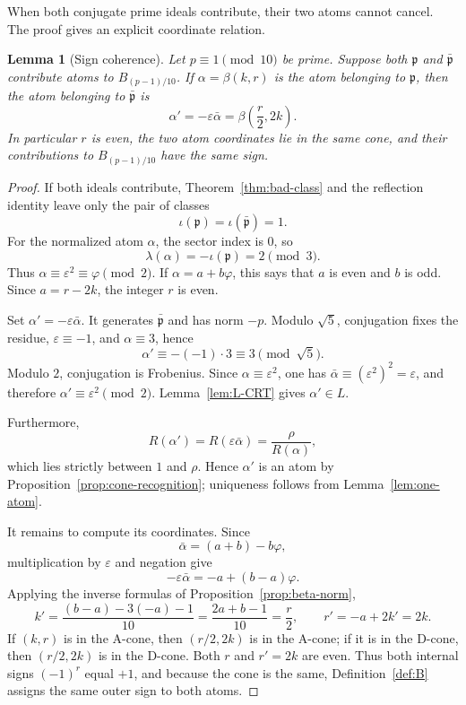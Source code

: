 \documentclass[12pt]{amsart}
\newtheorem{lemma}[theorem]{Lemma}
\theoremstyle{definition}
\theoremstyle{remark}
\newcommand{\eps}{\varepsilon}
\newcommand{\ph}{\varphi}
\begin{document}
When both conjugate prime ideals contribute, their two atoms cannot
cancel.  The proof gives an explicit coordinate relation.

\begin{lemma}[Sign coherence]\label{lem:sign-coherence}
Let $p\equiv1\pmod{10}$ be prime.  Suppose both
$\mathfrak p$ and $\bar{\mathfrak p}$ contribute atoms to
$B_{(p-1)/10}$.  If $\alpha=\beta(k,r)$ is the atom belonging to
$\mathfrak p$, then the atom belonging to $\bar{\mathfrak p}$ is
\[
  \alpha'=-\eps\bar\alpha
          =\beta\left(\frac r2,2k\right).
\]
In particular $r$ is even, the two atom coordinates lie in the same
cone, and their contributions to $B_{(p-1)/10}$ have the same sign.
\end{lemma}

\begin{proof}
If both ideals contribute, Theorem~\ref{thm:bad-class} and the
reflection identity leave only the pair of classes
\[
  \iota(\mathfrak p)=\iota(\bar{\mathfrak p})=1.
\]
For the normalized atom $\alpha$, the sector index is $0$, so
\[
  \lambda(\alpha)=-\iota(\mathfrak p)=2\pmod3.
\]
Thus $\alpha\equiv\eps^2\equiv\ph\pmod2$.  If
$\alpha=a+b\ph$, this says that $a$ is even and $b$ is odd.  Since
$a=r-2k$, the integer $r$ is even.

Set $\alpha'=-\eps\bar\alpha$.  It generates
$\bar{\mathfrak p}$ and has norm $-p$.  Modulo $\sqrt5$, conjugation
fixes the residue, $\eps\equiv-1$, and $\alpha\equiv3$, hence
\[
  \alpha'\equiv-(-1)\cdot3\equiv3\pmod{\sqrt5}.
\]
Modulo $2$, conjugation is Frobenius.  Since
$\alpha\equiv\eps^2$, one has
$\bar\alpha\equiv(\eps^2)^2=\eps$, and therefore
$\alpha'\equiv\eps^2\pmod2$.  Lemma~\ref{lem:L-CRT} gives
$\alpha'\in L$.

Furthermore,
\[
  R(\alpha')=R(\eps\bar\alpha)=\frac{\rho}{R(\alpha)},
\]
which lies strictly between $1$ and $\rho$.  Hence $\alpha'$ is an
atom by Proposition~\ref{prop:cone-recognition}; uniqueness follows
from Lemma~\ref{lem:one-atom}.

It remains to compute its coordinates.  Since
\[
  \bar\alpha=(a+b)-b\ph,
\]
multiplication by $\eps$ and negation give
\[
  -\eps\bar\alpha=-a+(b-a)\ph.
\]
Applying the inverse formulas of Proposition~\ref{prop:beta-norm},
\[
  k'=\frac{(b-a)-3(-a)-1}{10}
     =\frac{2a+b-1}{10}=\frac r2,
  \qquad
  r'=-a+2k'=2k.
\]
If $(k,r)$ is in the A-cone, then $(r/2,2k)$ is in the A-cone; if it
is in the D-cone, then $(r/2,2k)$ is in the D-cone.  Both $r$ and
$r'=2k$ are even.  Thus both internal signs $(-1)^r$ equal $+1$, and
because the cone is the same, Definition~\ref{def:B} assigns the same
outer sign to both atoms.
\end{proof}
\end{document}
